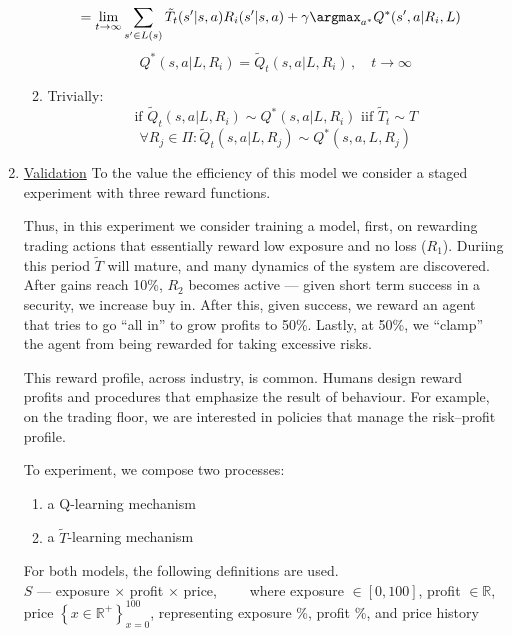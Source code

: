 \begin{enumerate}[label=1.0.\arabic*]
\begin{enumerate}[label=\arabic*.]
\begin{align}
& = \lim_{t \to \infty} \sum_{s^{\prime} \in L( s )} \tilde{T}_t( s^\prime | s, a ) R_i( s^\prime | s, a ) + \gamma \argmax_{a^{\ast}} Q^{\ast}( s^{\prime}, a | R_i, L )
\end{align}
\begin{equation}
Q^{\ast}( s, a | L, R_i ) = \tilde{Q}_{t}( s, a | L, R_i )\,,\quad t \to \infty
\end{equation}
\item Trivially: 
\begin{equation}
\text{if\ }\tilde{Q}_{t}( s, a | L, R_i ) \sim Q^{\ast}( s, a | L, R_i ) \text{\ iif\ }\tilde{T}_t \sim T
\end{equation}
\begin{equation}
\forall R_j \in \Pi: \tilde{Q}_t( s, a | L, R_j) \sim Q^{\ast}( s, a, L, R_j )
\end{equation}
\end{enumerate}
\item \underline{Validation}
To the value the efficiency of this model we consider a staged experiment with three reward functions.

Thus, in this experiment we consider training a model, first, on rewarding trading actions that essentially reward low exposure and no loss ($R_1$). Duriing this period $\tilde{T}$ will mature, and many dynamics of the system are discovered. After gains reach 10\%, $R_2$ becomes active --- given short term success in a security, we increase buy in. After this, given success, we reward an agent that tries to go ``all in'' to grow profits to 50\%. Lastly, at 50\%, we ``clamp'' the agent from being rewarded for taking excessive risks.

This reward profile, across industry, is common. Humans design reward profits and procedures that emphasize the result of behaviour. For example, on the trading floor, we are interested in policies that manage the risk--profit profile.

To experiment, we compose two processes:
\begin{enumerate}[label=\circled{\arabic*}]
\item a Q-learning mechanism
\item a $\tilde{T}$-learning mechanism
\end{enumerate}
For both models, the following definitions are used.\\

$S$ --- exposure $\times$ profit $\times$ price,$\qquad$ where exposure $\in [0,100]$, profit $\in \mathbb{R}$, price $\left\{ x\in \mathbb{R}^{+} \right\}_{x=0}^{100}$, representing exposure \%, profit \%, and price history \\


\end{enumerate}
